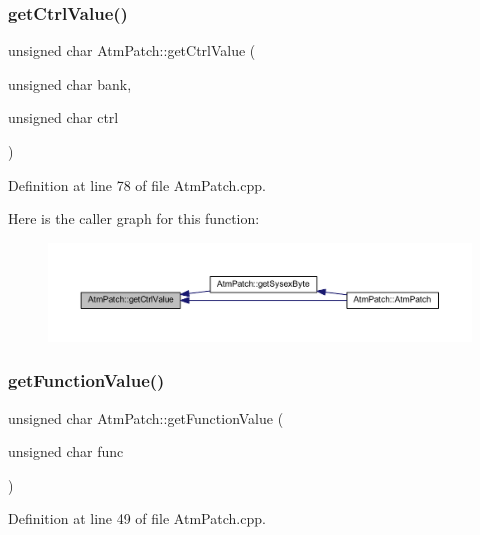 \subsubsection{\texorpdfstring{get\+Ctrl\+Value()}{getCtrlValue()}}
{\footnotesize\ttfamily unsigned char Atm\+Patch\+::get\+Ctrl\+Value (\begin{DoxyParamCaption}\item[{unsigned char}]{bank,  }\item[{unsigned char}]{ctrl }\end{DoxyParamCaption})}



Definition at line 78 of file Atm\+Patch.\+cpp.

Here is the caller graph for this function\+:
\nopagebreak
\begin{figure}[H]
\begin{center}
\leavevmode
\includegraphics[width=350pt]{class_atm_patch_a5e8835fb80bdd1f130f129edde447d35_icgraph}
\end{center}
\end{figure}
\mbox{\label{class_atm_patch_a7b4184a7f5bd314e150f9ad38cc3a0fb}} 
\subsubsection{\texorpdfstring{get\+Function\+Value()}{getFunctionValue()}}
{\footnotesize\ttfamily unsigned char Atm\+Patch\+::get\+Function\+Value (\begin{DoxyParamCaption}\item[{unsigned char}]{func }\end{DoxyParamCaption})}



Definition at line 49 of file Atm\+Patch.\+cpp.

